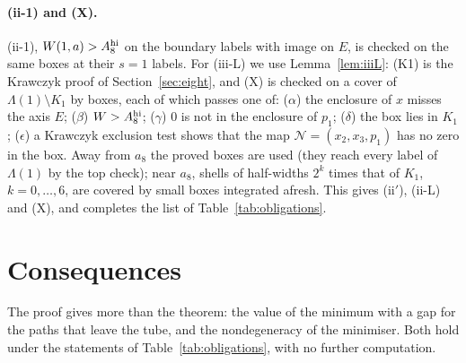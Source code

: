 \documentclass[11pt]{article}
\theoremstyle{definition}
\begin{document}
\paragraph{(ii-1) and (X).} (ii-1), $W(1,a)>A_8^{\rm hi}$ on the boundary labels with image on $E$, is checked on the
same boxes at their $s=1$ labels. For (iii-L) we use Lemma~\ref{lem:iiiL}: (K1) is the Krawczyk proof of
Section~\ref{sec:eight}, and (X) is checked on a cover of $\Lambda(1)\setminus K_1$ by boxes, each of which passes one
of: ($\alpha$) the enclosure of $x$ misses the axis $E$; ($\beta$) $W>A_8^{\rm hi}$; ($\gamma$) $0$ is not in the
enclosure of $p_1$; ($\delta$) the box lies in $K_1$; ($\epsilon$) a Krawczyk exclusion test shows that the map
$\mathcal N=(x_2,x_3,p_1)$ has no zero in the box. Away from $a_8$ the proved boxes are used (they reach every label of
$\Lambda(1)$ by the top check); near $a_8$, shells of half-widths $2^k$ times that of $K_1$, $k=0,\dots,6$, are covered
by small boxes integrated afresh. This gives (ii$'$), (ii-L) and (X), and completes the list of
Table~\ref{tab:obligations}.

\section{Consequences}\label{sec:cons}
The proof gives more than the theorem: the value of the minimum with a gap for the paths that leave the tube, and the
nondegeneracy of the minimiser. Both hold under the statements of Table~\ref{tab:obligations}, with no further
computation.
\end{document}
